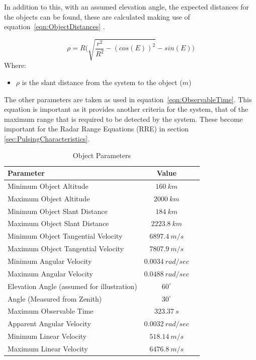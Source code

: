 \documentclass[11pt]{witseiepaper}
\begin{document}
\begin{bibunit}[witseie]
In addition to this, with an assumed elevation angle, the expected distances for the objects can be found, these are calculated making use of equation~\ref{eqn:ObjectDistances} \cite{ObservableTime}.


\begin{equation} \label{eqn:ObjectDistances}
    \rho = R \Bigg(\sqrt{\frac{r^2}{R^2} - (cos(E))^2} - sin(E) \Bigg)
    \end{equation}
Where:
\begin{itemize}
    \item $\rho$ is the slant distance from the system to the object ($m$)
\end{itemize}
The other parameters are taken as used in equation~\ref{eqn:ObservableTime}.
This equation is important as it provides another criteria for the system, that of the maximum range that is required to be detected by the system. These become important for the Radar Range Equations (RRE) in section \ref{sec:PulsingCharacteristics}.

\begin{table}
    \caption{Object Parameters}
    \label{tab:ObjectParameters}
    \begin{center}
        \begin{tabular}{p{70mm}cp{70mm}}
            \hline 
            Parameter & Value \\
            \hline
            Minimum Object Altitude & $160~km$ \\
            Maximum Object Altitude & $2000~km$ \\
            Minimum Object Slant Distance & $184~km$ \\
            Maximum Object Slant Distance & $2223.8~km$ \\            
            Minimum Object Tangential Velocity & $6897.4~m/s$ \\
            Maximum Object Tangential Velocity & $7807.9~m/s$ \\
            Minimum Angular Velocity & $0.0034~rad/sec$ \\
            Maximum Angular Velocity & $0.0488~rad/sec$ \\
            Elevation Angle (assumed for illustration) & $60^{\circ}$ \\
            Angle (Measured from Zenith) & $30^{\circ}$ \\
            Maximum Observable Time & $323.37~s$ \\
            Apparent Angular Velocity & $0.0032~rad/sec$ \\
            Minimum Linear Velocity & $518.14~m/s$ \\
            Maximum Linear Velocity & $6476.8~m/s$ \\
        \end{tabular}
    \end{center}
\end{table}


\end{bibunit}
\end{document}
